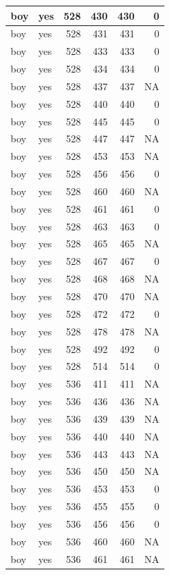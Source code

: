\documentclass[man]{apa6}
\begin{document}
\begin{tabular}{l|l|r|r|r|r}
\hline
boy & yes & 528 & 430 & 430 & 0\\
\hline
boy & yes & 528 & 431 & 431 & 0\\
\hline
boy & yes & 528 & 433 & 433 & 0\\
\hline
boy & yes & 528 & 434 & 434 & 0\\
\hline
boy & yes & 528 & 437 & 437 & NA\\
\hline
boy & yes & 528 & 440 & 440 & 0\\
\hline
boy & yes & 528 & 445 & 445 & 0\\
\hline
boy & yes & 528 & 447 & 447 & NA\\
\hline
boy & yes & 528 & 453 & 453 & NA\\
\hline
boy & yes & 528 & 456 & 456 & 0\\
\hline
boy & yes & 528 & 460 & 460 & NA\\
\hline
boy & yes & 528 & 461 & 461 & 0\\
\hline
boy & yes & 528 & 463 & 463 & 0\\
\hline
boy & yes & 528 & 465 & 465 & NA\\
\hline
boy & yes & 528 & 467 & 467 & 0\\
\hline
boy & yes & 528 & 468 & 468 & NA\\
\hline
boy & yes & 528 & 470 & 470 & NA\\
\hline
boy & yes & 528 & 472 & 472 & 0\\
\hline
boy & yes & 528 & 478 & 478 & NA\\
\hline
boy & yes & 528 & 492 & 492 & 0\\
\hline
boy & yes & 528 & 514 & 514 & 0\\
\hline
boy & yes & 536 & 411 & 411 & NA\\
\hline
boy & yes & 536 & 436 & 436 & NA\\
\hline
boy & yes & 536 & 439 & 439 & NA\\
\hline
boy & yes & 536 & 440 & 440 & NA\\
\hline
boy & yes & 536 & 443 & 443 & NA\\
\hline
boy & yes & 536 & 450 & 450 & NA\\
\hline
boy & yes & 536 & 453 & 453 & 0\\
\hline
boy & yes & 536 & 455 & 455 & 0\\
\hline
boy & yes & 536 & 456 & 456 & 0\\
\hline
boy & yes & 536 & 460 & 460 & NA\\
\hline
boy & yes & 536 & 461 & 461 & NA\\

\end{tabular}
\end{document}
